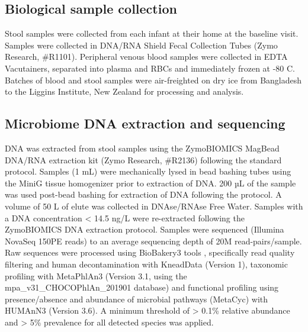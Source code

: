 \documentclass{article}
\begin{document}
\subsection*{Biological sample collection}
Stool samples were collected from each infant at their home at the baseline visit.
Samples were collected in DNA/RNA Shield Fecal Collection Tubes (Zymo Research, \#R1101).
Peripheral venous blood samples were collected in EDTA Vacutainers, separated into plasma and RBCs and immediately frozen at -80 C.
Batches of blood and stool samples were air-freighted on dry ice from Bangladesh to the Liggins Institute, New Zealand for processing and analysis. 

\subsection*{Microbiome DNA extraction and sequencing}
DNA was extracted from stool samples using the ZymoBIOMICS MagBead DNA/RNA extraction kit (Zymo Research, \#R2136) following the standard protocol.
Samples (1 mL) were mechanically lysed in bead bashing tubes using the MiniG tissue homogenizer prior to extraction of DNA.
200 µL of the sample was used post-bead bashing for extraction of DNA following the protocol.
A volume of 50 \textmu{} L of elute was collected in DNAse/RNAse Free Water.
Samples with a DNA concentration \textless{} 14.5 ng/\textmu{}L were re-extracted following the ZymoBIOMICS DNA extraction protocol.
Samples were sequenced (Illumina NovaSeq 150PE reads) to an average sequencing depth of 20M read-pairs/sample.
Raw sequences were processed using BioBakery3 tools \cite{beghini2021integrating}, specifically read quality filtering and human decontamination with KneadData (Version 1), taxonomic profiling with MetaPhlAn3 (Version 3.1, using the mpa\_v31\_CHOCOPhlAn\_201901 database) and functional profiling using presence/absence and abundance of microbial pathways (MetaCyc) with HUMAnN3 (Version 3.6).
A minimum threshold of \textgreater{} 0.1\% relative abundance and \textgreater{} 5\% prevalence for all detected species was applied. 
\end{document}
